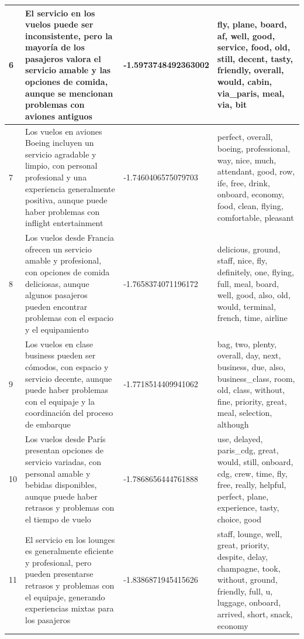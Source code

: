 \documentclass{report}
\begin{document}
\begin{longtable}{|p{1cm}|p{4cm}|p{4cm}|p{6cm}|}
                    \hline
                    6 & El servicio en los vuelos puede ser inconsistente, pero la mayoría de los pasajeros valora el servicio amable y las opciones de comida, aunque se mencionan problemas con aviones antiguos & -1.5973748492363002 & fly, plane, board, af, well, good, service, food, old, still, decent, tasty, friendly, overall, would, cabin, via\_paris, meal, via, bit \\
                    \hline
                    7 & Los vuelos en aviones Boeing incluyen un servicio agradable y limpio, con personal profesional y una experiencia generalmente positiva, aunque puede haber problemas con inflight entertainment & -1.7460406575079703 & perfect, overall, boeing, professional, way, nice, much, attendant, good, row, ife, free, drink, onboard, economy, food, clean, flying, comfortable, pleasant \\
                    \hline
                    8 & Los vuelos desde Francia ofrecen un servicio amable y profesional, con opciones de comida deliciosas, aunque algunos pasajeros pueden encontrar problemas con el espacio y el equipamiento & -1.7658374071196172 & delicious, ground, staff, nice, fly, definitely, one, flying, full, meal, board, well, good, also, old, would, terminal, french, time, airline \\
                    \hline
                    9 & Los vuelos en clase business pueden ser cómodos, con espacio y servicio decente, aunque puede haber problemas con el equipaje y la coordinación del proceso de embarque & -1.7718514409941062 & bag, two, plenty, overall, day, next, business, due, also, business\_class, room, old, class, without, fine, priority, great, meal, selection, although \\
                    \hline
                    10 & Los vuelos desde París presentan opciones de servicio variadas, con personal amable y bebidas disponibles, aunque puede haber retrasos y problemas con el tiempo de vuelo & -1.7868656444761888 & use, delayed, paris\_cdg, great, would, still, onboard, cdg, crew, time, fly, free, really, helpful, perfect, plane, experience, tasty, choice, good \\
                    \hline
                    11 & El servicio en los lounges es generalmente eficiente y profesional, pero pueden presentarse retrasos y problemas con el equipaje, generando experiencias mixtas para los pasajeros & -1.8386871945415626 & staff, lounge, well, great, priority, despite, delay, champagne, took, without, ground, friendly, full, u, luggage, onboard, arrived, short, snack, economy \\

\end{longtable}
\end{document}
